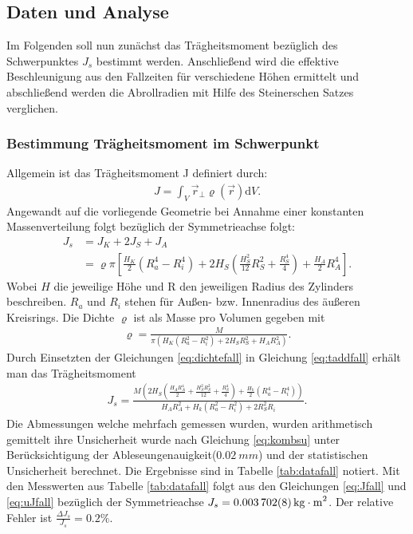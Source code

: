 \subsection{Daten und Analyse} %
Im Folgenden soll nun zunächst das Trägheitsmoment bezüglich des Schwerpunktes $J_s$ bestimmt werden. Anschließend wird die effektive Beschleunigung aus den Fallzeiten für verschiedene Höhen ermittelt und abschließend werden die Abrollradien mit Hilfe des Steinerschen Satzes verglichen.

\subsubsection{Bestimmung Trägheitsmoment im Schwerpunkt}

Allgemein ist das Trägheitsmoment J definiert durch:
\begin{align}
J= \int_{V} \vec{r}_{\perp} \varrho (\vec{r}) \mathrm{d}V.
\end{align}
Angewandt auf die vorliegende Geometrie bei Annahme einer konstanten Massenverteilung folgt bezüglich der Symmetrieachse folgt: 
\begin{align}
J_s&= J_{K}+2J_{S}+J_{A}\\
&=\varrho \pi \left[\frac{H_K}{2} (R_a^4-R_i^4)+  2 H_S(\frac{H_S^2}{12} R_S^2+\frac{R_S^4}{4})+  \frac{H_A}{2}R_A^4  \right] \label{eq:taddfall}.
\end{align}	
Wobei $H$ die jeweilige Höhe und R den jeweiligen Radius des Zylinders beschreiben. $R_a$ und $R_i$ stehen für Außen- bzw. Innenradius des äußeren Kreisrings. Die Dichte $\varrho$ ist als Masse pro Volumen gegeben mit
\begin{align}
	\varrho=\frac{M}{\pi(H_K  (R_a^2-R_i^2)+2 H_S  R_S^2+ H_A  R_A^2)}. \label{eq:dichtefall}
\end{align} 
Durch Einsetzten der Gleichungen \ref{eq:dichtefall} in Gleichung \ref{eq:taddfall} erhält man das Trägheitsmoment
\begin{align}
J_s=\frac{M \left(2 H_{S} \left(\frac{H_{A} R_{A}^{4}}{2} + \frac{H_{S}^{2} R_{S}^{2}}{12} + \frac{R_{S}^{4}}{4}\right) + \frac{ H_{k}}{2} \left(R_{a}^{4} - R_{i}^{4}\right)\right)}{H_{A} R_{A}^{2} + H_{k} \left(R_{a}^{2} - R_{i}^{2}\right) + 2 R_{S}^{2} R_{i}} \label{eq:Jfall}.
\end{align}
Die Abmessungen welche mehrfach gemessen wurden, wurden arithmetisch gemittelt ihre Unsicherheit wurde nach Gleichung \ref{eq:kombsu} unter Berücksichtigung der Ableseungenauigkeit($\SI{0.02}{mm}$)  und der statistischen Unsicherheit berechnet. Die Ergebnisse sind in Tabelle \ref{tab:datafall} notiert.
Mit den Messwerten aus Tabelle \ref{tab:datafall} folgt aus den Gleichungen \ref{eq:Jfall} und \ref{eq:uJfall} bezüglich der Symmetrieachse $J_s=\SI{0.003702 \pm 0.000008}{kg\cdot m^2}$. Der relative Fehler ist $\frac{\Delta J_s}{J_s}=0.2\%$. 



